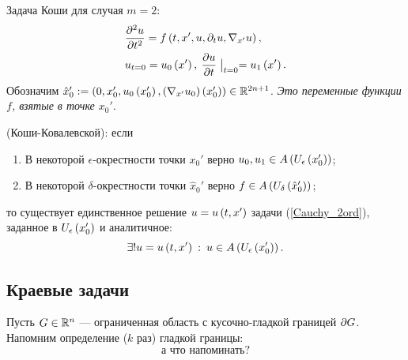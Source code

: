     Задача Коши для случая $m = 2$:
    \begin{align}
        & \frac{\partial^2u}{\partial{t}^2} = f\left({t, x', u, \partial_t u, \nabla_{x'} u}\right), \label{Cauchy_2ord} \\
        & u_{t=0} = u_0\left({x'}\right),\: \frac{\partial u}{\partial t} \bigm|_{t=0} = u_1\left({x'}\right). \notag
    \end{align}
    Обозначим $\hat{x}_0' := \left({0, x_0', u_0\left({x_0'}\right), \left({\nabla_{x'}u_0}\right)\left({x_0'}\right)}\right) \in \mathbb{R}^{2n+1}$.
    \textit{Это переменные функции $f$, взятые в точке $x_0'$}.
    \begin{theorem}
        (Коши-Ковалевской): если
        \begin{enumerate}
            \item В некоторой $\epsilon$-окрестности точки $x_0'$ верно $u_0, u_1 \in A\left({U_{\epsilon}\left({x_0'}\right)}\right)$;
            \item В некоторой $\delta$-окрестности точки $\hat{x}_0'$ верно $f \in A\left({U_{\delta}\left({\hat{x}_0'}\right)}\right)$;
        \end{enumerate}
        то существует единственное решение $u = u\left({t,x'}\right)$ задачи (\ref{Cauchy_2ord}), заданное в $U_{\epsilon}\left({x_0'}\right)$ и аналитичное:
        \begin{equation*}
            \exists! u = u\left({t, x'}\right) \::\: u \in A\left({U_{\epsilon}\left({x_0'}\right)}\right).
        \end{equation*}
    \end{theorem}

\subsection{Краевые задачи}
    Пусть $G \in \mathbb{R}^n$ --- ограниченная область с кусочно-гладкой границей $\partial G$. Напомним определение ($k$ раз) гладкой границы:
    \begin{equation*}
        \textrm{а что напоминать?}
    \end{equation*}

